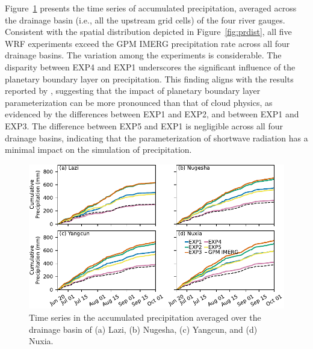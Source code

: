 \documentclass[draft]{agujournal2019}
\begin{document}
Figure~\ref{fig:prcumupts} presents the time series of accumulated precipitation, averaged across the drainage basin (i.e., all the upstream grid cells) of the four river gauges. Consistent with the spatial distribution depicted in Figure~\ref{fig:prdist}, all five WRF experiments exceed the GPM IMERG precipitation rate across all four drainage basins. The variation among the experiments is considerable. The disparity between EXP4 and EXP1 underscores the significant influence of the planetary boundary layer on precipitation. This finding aligns with the results reported by , suggesting that the impact of planetary boundary layer parameterization can be more pronounced than that of cloud physics, as evidenced by the differences between EXP1 and EXP2, and between EXP1 and EXP3. The difference between EXP5 and EXP1 is negligible across all four drainage basins, indicating that the parameterization of shortwave radiation has a minimal impact on the simulation of precipitation.

\begin{figure}[h!]
  \centering
  \noindent\includegraphics[width=140mm]{prrn_prcumupts.pdf}
  \caption{Time series in the accumulated precipitation averaged over the drainage basin of (a) Lazi, (b) Nugesha, (c) Yangcun, and (d) Nuxia.}\label{fig:prcumupts}
\end{figure}
\end{document}
